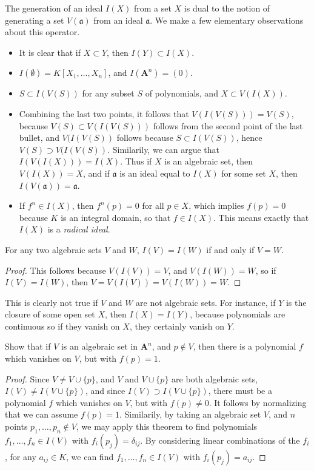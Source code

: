 The generation of an ideal $I(X)$ from a set $X$ is dual to the notion of generating a set $V(\mathfrak{a})$ from an ideal $\mathfrak{a}$. We make a few elementary observations about this operator.
%
\begin{itemize}
    \item It is clear that if $X \subset Y$, then $I(Y) \subset I(X)$.
    \item $I(\emptyset) = K[X_1, \dots, X_n]$, and $I(\mathbf{A}^n) = (0)$.
    \item $S \subset I(V(S))$ for any subset $S$ of polynomials, and $X \subset V(I(X))$.
    \item Combining the last two points, it follows that $V(I(V(S))) = V(S)$, because $V(S) \subset V(I(V(S)))$ follows from the second point of the last bullet, and $V(I(V(S))$ follows because $S \subset I(V(S))$, hence $V(S) \supset V(I(V(S))$. Similarily, we can argue that $I(V(I(X))) = I(X)$. Thus if $X$ is an algebraic set, then $V(I(X)) = X$, and if $\mathfrak{a}$ is an ideal equal to $I(X)$ for some set $X$, then $I(V(\mathfrak{a})) = \mathfrak{a}$.
    \item If $f^n \in I(X)$, then $f^n(p) = 0$ for all $p \in X$, which implies $f(p) = 0$ because $K$ is an integral domain, so that $f \in I(X)$. This means exactly that $I(X)$ is a {\it radical ideal}.
\end{itemize}

\begin{prop}
    For any two algebraic sets $V$ and $W$, $I(V) = I(W)$ if and only if $V = W$.
\end{prop}
\begin{proof}
    This follows because $V(I(V)) = V$, and $V(I(W)) = W$, so if $I(V) = I(W)$, then $V = V(I(V)) = V(I(W)) = W$.
\end{proof}

This is clearly not true if $V$ and $W$ are not algebraic sets. For instance, if $Y$ is the closure of some open set $X$, then $I(X) = I(Y)$, because polynomials are continuous so if they vanish on $X$, they certainly vanish on $Y$.

\begin{corollary}
    Show that if $V$ is an algebraic set in $\mathbf{A}^n$, and $p \not \in V$, then there is a polynomial $f$ which vanishes on $V$, but with $f(p) = 1$.
\end{corollary}
\begin{proof}
    Since $V \neq V \cup \{ p \}$, and $V$ and $V \cup \{ p \}$ are both algebraic sets, $I(V) \neq I(V \cup \{ p \})$, and since $I(V) \supset I(V \cup \{ p \})$, there must be a polynomial $f$ which vanishes on $V$, but with $f(p) \neq 0$. It follows by normalizing that we can assume $f(p) = 1$. Similarily, by taking an algebraic set $V$, and $n$ points $p_1, \dots, p_n \not \in V$, we may apply this theorem to find polynomials $f_1, \dots, f_n \in I(V)$ with $f_i(p_j) = \delta_{ij}$. By considering linear combinations of the $f_i$, for any $a_{ij} \in K$, we can find $f_1, \dots, f_n \in I(V)$ with $f_i(p_j) = a_{ij}$.
\end{proof}

